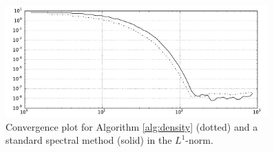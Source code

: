\documentclass[final,leqno]{siamart}
\begin{document}
\begin{figure}[h!]
	\hspace*{-1.2cm}
	\centering
	\includegraphics[width=0.9\textwidth]{./images/convergence_plot.pdf}
	\caption{Convergence plot for Algorithm \ref{alg:density} (dotted) and a standard spectral method (solid) in the $L^{1}$-norm.}
	\label{fig:convergence}
\end{figure}

%
\end{document}
